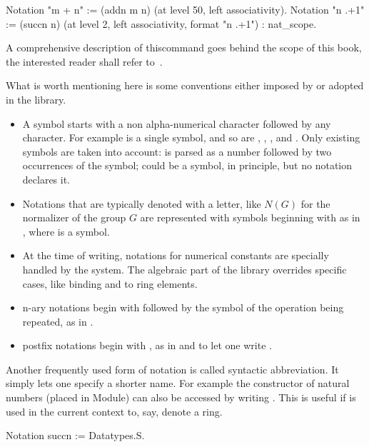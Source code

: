 \begin{coq}{}{}
Notation "m + n" := (addn m n) (at level 50, left associativity). 
Notation "n .+1" := (succn n) (at level 2, left associativity,
  format "n .+1") : nat_scope.
\end{coq}
A comprehensive description of thiscommand goes behind
the scope of this book, the interested reader shall refer to~\cite[Chapter 12]{Coq:manual}.

What is worth mentioning here is some conventions either imposed by \Coq{}
or adopted in the \mcbMC{} library.

\begin{itemize}
\item A symbol starts with a non alpha-numerical character followed by
	any character.  For example  is a single symbol, and so are
	, \C{\%/}, \C{<=}, and \C{[::}.  Only existing
	symbols are taken into account:  is parsed as a number
	followed by two occurrences of the  symbol;  could
	be a symbol, in principle, but no notation declares it.
\item Notations that are typically denoted with a letter, like $N(G)$ for the
	normalizer of the group $G$ are represented with symbols beginning
	with  as in , where  is a symbol.
\item At the time of writing, notations for numerical constants are specially
	handled by the system.  The algebraic part of the library overrides
	specific cases, like binding  and  to ring elements.
\item n-ary notations begin with \C{[} followed by the symbol of the
	operation being repeated, as in .
\item postfix notations begin with , as in  and 
	to let one write .
\end{itemize}

Another frequently used form of notation is called syntactic abbreviation.
It simply lets one specify a shorter name.  For example the  constructor
of natural numbers (placed in  Module) can also be accessed
by writing .  This is useful if  is used in the current context
to, say, denote a ring.

\begin{coq}{}{}
Notation succn := Datatypes.S.
\end{coq}

